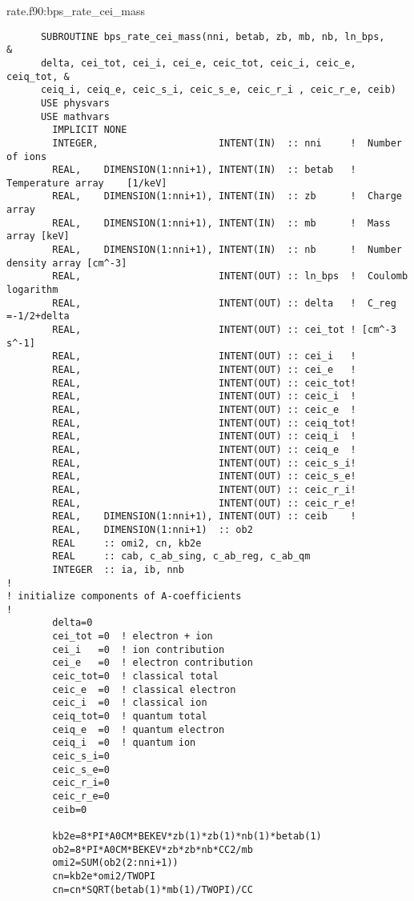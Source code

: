 \documentclass[preprint,12pt,eqsecnum,nofootinbib,amsmath,amssymb]{revtex4}
\begin{document}
{{{\vskip0.2cm 
\noindent
rate.f90:bps\_rate\_cei\_mass
{
\baselineskip 10pt
\begin{verbatim}
      SUBROUTINE bps_rate_cei_mass(nni, betab, zb, mb, nb, ln_bps,      & 
      delta, cei_tot, cei_i, cei_e, ceic_tot, ceic_i, ceic_e, ceiq_tot, &
      ceiq_i, ceiq_e, ceic_s_i, ceic_s_e, ceic_r_i , ceic_r_e, ceib)
      USE physvars
      USE mathvars    
        IMPLICIT NONE  
        INTEGER,                     INTENT(IN)  :: nni     !  Number of ions
        REAL,    DIMENSION(1:nni+1), INTENT(IN)  :: betab   !  Temperature array    [1/keV]
        REAL,    DIMENSION(1:nni+1), INTENT(IN)  :: zb      !  Charge array 
        REAL,    DIMENSION(1:nni+1), INTENT(IN)  :: mb      !  Mass array [keV]
        REAL,    DIMENSION(1:nni+1), INTENT(IN)  :: nb      !  Number density array [cm^-3]
        REAL,                        INTENT(OUT) :: ln_bps  !  Coulomb logarithm
        REAL,                        INTENT(OUT) :: delta   !  C_reg =-1/2+delta
        REAL,                        INTENT(OUT) :: cei_tot ! [cm^-3 s^-1]
        REAL,                        INTENT(OUT) :: cei_i   !
        REAL,                        INTENT(OUT) :: cei_e   !
        REAL,                        INTENT(OUT) :: ceic_tot!
        REAL,                        INTENT(OUT) :: ceic_i  !
        REAL,                        INTENT(OUT) :: ceic_e  !
        REAL,                        INTENT(OUT) :: ceiq_tot!
        REAL,                        INTENT(OUT) :: ceiq_i  !
        REAL,                        INTENT(OUT) :: ceiq_e  !
        REAL,                        INTENT(OUT) :: ceic_s_i!
        REAL,                        INTENT(OUT) :: ceic_s_e!
        REAL,                        INTENT(OUT) :: ceic_r_i!
        REAL,                        INTENT(OUT) :: ceic_r_e!
        REAL,    DIMENSION(1:nni+1), INTENT(OUT) :: ceib    !
        REAL,    DIMENSION(1:nni+1)  :: ob2
        REAL     :: omi2, cn, kb2e
        REAL     :: cab, c_ab_sing, c_ab_reg, c_ab_qm
        INTEGER  :: ia, ib, nnb
!
! initialize components of A-coefficients
!
        delta=0
        cei_tot =0  ! electron + ion
        cei_i   =0  ! ion contribution
        cei_e   =0  ! electron contribution
        ceic_tot=0  ! classical total
        ceic_e  =0  ! classical electron
        ceic_i  =0  ! classical ion
        ceiq_tot=0  ! quantum total
        ceiq_e  =0  ! quantum electron
        ceiq_i  =0  ! quantum ion
        ceic_s_i=0 
        ceic_s_e=0 
        ceic_r_i=0
        ceic_r_e=0
        ceib=0

        kb2e=8*PI*A0CM*BEKEV*zb(1)*zb(1)*nb(1)*betab(1)
        ob2=8*PI*A0CM*BEKEV*zb*zb*nb*CC2/mb
        omi2=SUM(ob2(2:nni+1))
        cn=kb2e*omi2/TWOPI
        cn=cn*SQRT(betab(1)*mb(1)/TWOPI)/CC


\end{verbatim}}}}}
\end{document}
